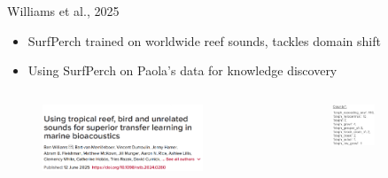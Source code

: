 \begin{frame}{Williams et al., 2025}
    \begin{itemize}
        \item SurfPerch trained on worldwide reef sounds, tackles domain shift
        \item Using SurfPerch on Paola's data for knowledge discovery
    \end{itemize}
    \begin{columns}
        \begin{column}{0.5\textwidth}
            \begin{figure}
                \centering
                \includegraphics[height=0.8\textheight,width=0.8\textwidth,keepaspectratio]{images/Williams_et_al_2025.png}
            \end{figure}
        \end{column}
        \begin{column}{0.5\textwidth}
            \begin{figure}
                \centering
                \includegraphics[height=0.5\textheight,width=0.5\textwidth,keepaspectratio]{images/surf_perch_results.png}
            \end{figure}
        \end{column}
    \end{columns}
\end{frame}

